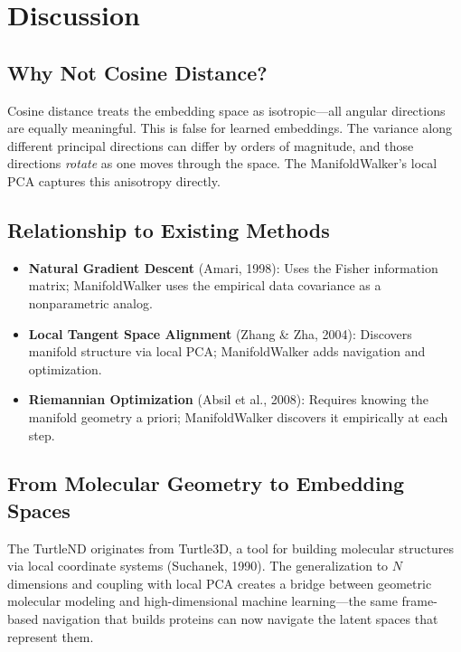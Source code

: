 \documentclass[11pt,letterpaper]{article}
\begin{document}
\section{Discussion}
\label{sec:discussion}

\subsection{Why Not Cosine Distance?}

Cosine distance treats the embedding space as isotropic---all angular
directions are equally meaningful. This is false for learned embeddings.
The variance along different principal directions can differ by orders of
magnitude, and those directions \emph{rotate} as one moves through the space.
The ManifoldWalker's local PCA captures this anisotropy directly.

\subsection{Relationship to Existing Methods}

\begin{itemize}[nosep]
  \item \textbf{Natural Gradient Descent} (Amari, 1998): Uses the Fisher
    information matrix; ManifoldWalker uses the empirical data covariance
    as a nonparametric analog.
  \item \textbf{Local Tangent Space Alignment} (Zhang \& Zha, 2004):
    Discovers manifold structure via local PCA; ManifoldWalker adds
    navigation and optimization.
  \item \textbf{Riemannian Optimization} (Absil et al., 2008): Requires
    knowing the manifold geometry a priori; ManifoldWalker discovers it
    empirically at each step.
\end{itemize}

\subsection{From Molecular Geometry to Embedding Spaces}

The TurtleND originates from Turtle3D, a tool for building molecular
structures via local coordinate systems (Suchanek, 1990). The generalization
to $N$ dimensions and coupling with local PCA creates a bridge between
geometric molecular modeling and high-dimensional machine learning---the
same frame-based navigation that builds proteins can now navigate the
latent spaces that represent them.
\end{document}
